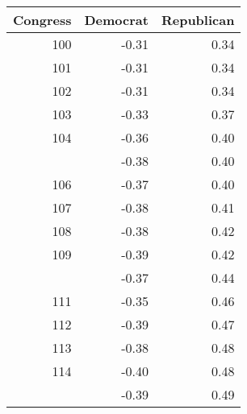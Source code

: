 \begin{table}[H]
\centering
\begin{tabular}{rrr}
\toprule
Congress & Democrat & Republican\\
\midrule
100 & -0.31 & 0.34\\
101 & -0.31 & 0.34\\
102 & -0.31 & 0.34\\
103 & -0.33 & 0.37\\
104 & -0.36 & 0.40\\
\addlinespace
105 & -0.38 & 0.40\\
106 & -0.37 & 0.40\\
107 & -0.38 & 0.41\\
108 & -0.38 & 0.42\\
109 & -0.39 & 0.42\\
\addlinespace
110 & -0.37 & 0.44\\
111 & -0.35 & 0.46\\
112 & -0.39 & 0.47\\
113 & -0.38 & 0.48\\
114 & -0.40 & 0.48\\
\addlinespace
115 & -0.39 & 0.49\\
\bottomrule
\end{tabular}
\end{table}